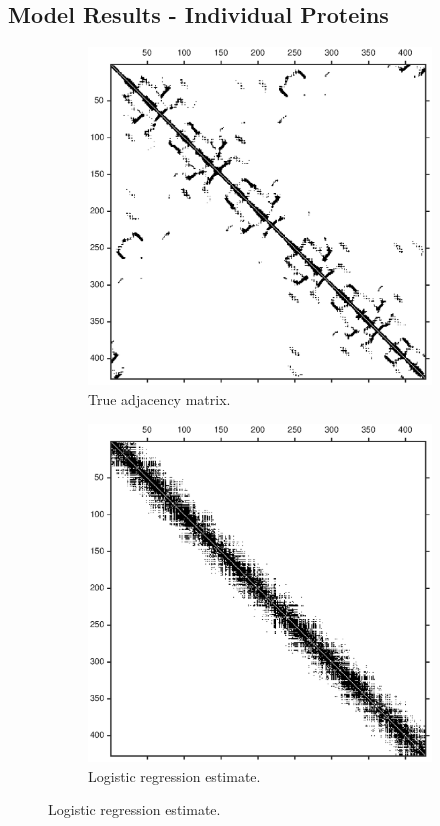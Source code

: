 \documentclass{article}
\begin{document}
\subsection{Model Results - Individual Proteins}
\begin{figure}
\centering
\begin{subfigure}{0.45\textwidth}
\includegraphics[width=\linewidth]{paper_images/true_adj.eps}
\caption{True adjacency matrix.}
\label{fig:gt_adj}
\end{subfigure}
\begin{subfigure}{0.45\textwidth}
\includegraphics[width=\linewidth]{paper_images/logistic_adj.eps}
\caption{Logistic regression estimate.}
\label{fig:log_adj}
\end{subfigure}


\end{figure}
\end{document}
